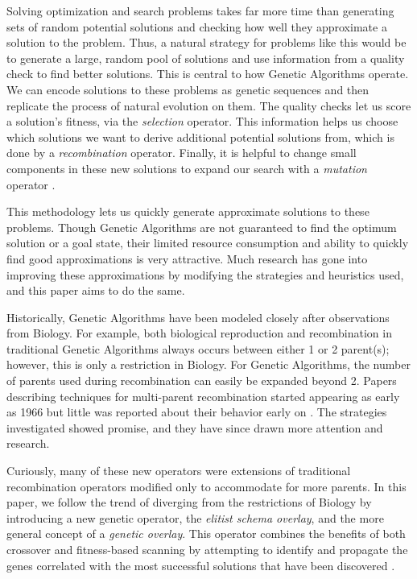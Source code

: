 Solving optimization and search problems takes far more time than generating sets of random potential solutions and checking how well they approximate a solution to the problem. Thus, a natural strategy for problems like this would be to generate a large, random pool of solutions and use information from a quality check to find better solutions. This is central to how Genetic Algorithms operate. We can encode solutions to these problems as genetic sequences and then replicate the process of natural evolution on them. The quality checks let us score a solution's fitness, via the \emph{selection} operator. This information helps us choose which solutions we want to derive additional potential solutions from, which is done by a \emph{recombination} operator. Finally, it is helpful to change small components in these new solutions to expand our search with a \emph{mutation} operator \cite{Deb99}.

This methodology lets us quickly generate approximate solutions to these problems. Though Genetic Algorithms are not guaranteed to find the optimum solution or a goal state, their limited resource consumption and ability to quickly find good approximations is very attractive\cite{Russell10}. Much research has gone into improving these approximations by modifying the strategies and heuristics used, and this paper aims to do the same.

Historically, Genetic Algorithms have been modeled closely after observations from Biology. For example, both biological reproduction and recombination in traditional Genetic Algorithms always occurs between either 1 or 2 parent(s); however, this is only a restriction in Biology\cite{Eiben95}. For Genetic Algorithms, the number of parents used during recombination can easily be expanded beyond 2. Papers describing techniques for multi-parent recombination started appearing as early as 1966 but little was reported about their behavior early on \cite{Eiben03}. The strategies investigated showed promise, and they have since drawn more attention and research\cite{Eiben94}. 

Curiously, many of these new operators were extensions of traditional recombination operators modified only to accommodate for more parents. In this paper, we follow the trend of diverging from the restrictions of Biology by introducing a new genetic operator, the \emph{elitist schema overlay}, and the more general concept of a \emph{genetic overlay}. This operator combines the benefits of both crossover and fitness-based scanning by attempting to identify and propagate the genes correlated with the most successful solutions that have been discovered \cite{Russell10}. 